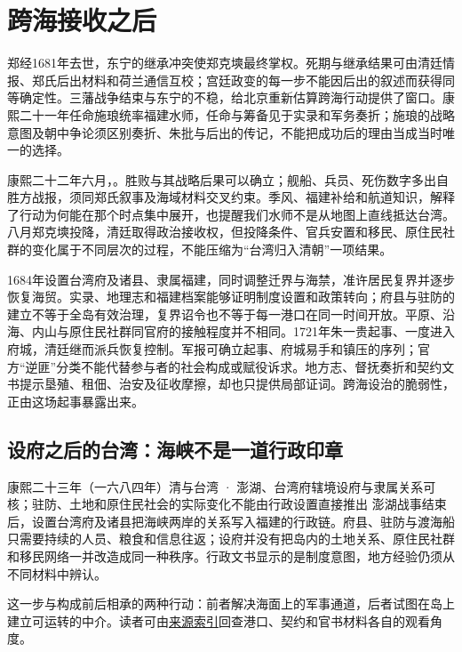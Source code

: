 \section{跨海接收之后}

郑经1681年去世，东宁的继承冲突使郑克塽最终掌权。死期与继承结果可由清廷情报、郑氏后出材料和荷兰通信互校；宫廷政变的每一步不能因后出的叙述而获得同等确定性。三藩战争结束与东宁的不稳，给北京重新估算跨海行动提供了窗口。康熙二十一年任命施琅统率福建水师，任命与筹备见于实录和军务奏折；施琅的战略意图及朝中争论须区别奏折、朱批与后出的传记，不能把成功后的理由当成当时唯一的选择。

康熙二十二年六月，。胜败与其战略后果可以确立；舰船、兵员、死伤数字多出自胜方战报，须同郑氏叙事及海域材料交叉约束。季风、福建补给和航道知识，解释了行动为何能在那个时点集中展开，也提醒我们水师不是从地图上直线抵达台湾。八月郑克塽投降，清廷取得政治接收权，但投降条件、官兵安置和移民、原住民社群的变化属于不同层次的过程，不能压缩为“台湾归入清朝”一项结果。

1684年设置台湾府及诸县、隶属福建，同时调整迁界与海禁，准许居民复界并逐步恢复海贸。实录、地理志和福建档案能够证明制度设置和政策转向；府县与驻防的建立不等于全岛有效治理，复界诏令也不等于每一港口在同一时间开放。平原、沿海、内山与原住民社群同官府的接触程度并不相同。1721年朱一贵起事、一度进入府城，清廷继而派兵恢复控制。军报可确立起事、府城易手和镇压的序列；官方“逆匪”分类不能代替参与者的社会构成或赋役诉求。地方志、督抚奏折和契约文书提示垦殖、租佃、治安及征收摩擦，却也只提供局部证词。跨海设治的脆弱性，正由这场起事暴露出来。

\subsection{设府之后的台湾：海峡不是一道行政印章}
\begin{event}{}{康熙二十三年（一六八四年）}{清与台湾 · 澎湖、台湾府辖境}{设府与隶属关系可核；驻防、土地和原住民社会的实际变化不能由行政设置直接推出}
澎湖战事结束后，设置台湾府及诸县把海峡两岸的关系写入福建的行政链。府县、驻防与渡海船只需要持续的人员、粮食和信息往返；设府并没有把岛内的土地关系、原住民社群和移民网络一并改造成同一种秩序。行政文书显示的是制度意图，地方经验仍须从不同材料中辨认。

这一步与构成前后相承的两种行动：前者解决海面上的军事通道，后者试图在岛上建立可运转的中介。读者可由\hyperref[app:sources]{来源索引}回查港口、契约和官书材料各自的观看角度。
\end{event}